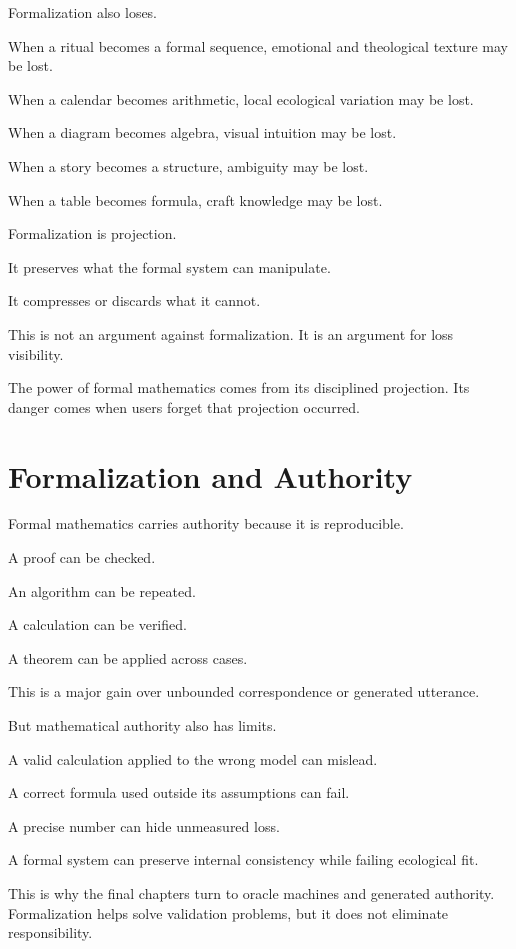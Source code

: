 \documentclass[11pt]{book}
\begin{document}
Formalization also loses.

When a ritual becomes a formal sequence, emotional and theological texture may be lost.

When a calendar becomes arithmetic, local ecological variation may be lost.

When a diagram becomes algebra, visual intuition may be lost.

When a story becomes a structure, ambiguity may be lost.

When a table becomes formula, craft knowledge may be lost.

Formalization is projection.

It preserves what the formal system can manipulate.

It compresses or discards what it cannot.

This is not an argument against formalization. It is an argument for loss visibility.

The power of formal mathematics comes from its disciplined projection. Its danger comes when users forget that projection occurred.

\section{Formalization and Authority}

Formal mathematics carries authority because it is reproducible.

A proof can be checked.

An algorithm can be repeated.

A calculation can be verified.

A theorem can be applied across cases.

This is a major gain over unbounded correspondence or generated utterance.

But mathematical authority also has limits.

A valid calculation applied to the wrong model can mislead.

A correct formula used outside its assumptions can fail.

A precise number can hide unmeasured loss.

A formal system can preserve internal consistency while failing ecological fit.

This is why the final chapters turn to oracle machines and generated authority. Formalization helps solve validation problems, but it does not eliminate responsibility.
\end{document}
